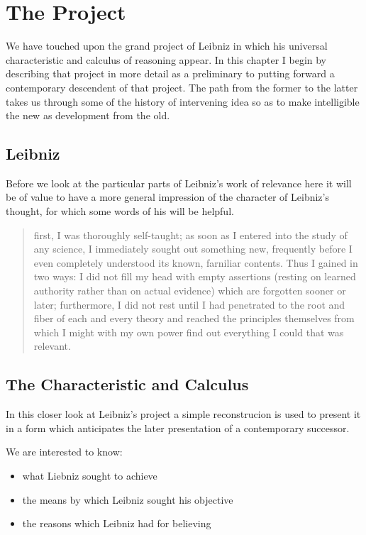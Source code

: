 
\chapter{The Project}\label{TheProject}

We have touched upon the grand project of Leibniz in which his universal characteristic
and calculus of reasoning appear.
In this chapter I begin by describing that project in more detail as a preliminary
to putting forward a contemporary descendent of that project.
The path from the former to the latter takes us through some of the history of
intervening idea so as to make intelligible the new as development from the old. 

\section{Leibniz}

Before we look at the particular parts of Leibniz's work of relevance here it will
be of value to have a more general impression of the character of Leibniz's thought,
for which some words of his will be helpful.

\begin{quotation}
first, I was thoroughly self-taught; as soon as I entered into the study of any science,
I immediately sought out something new, frequently before I even completely understood its known, farniliar contents.
Thus I gained in two ways: I did not fill my head with empty assertions (resting on learned authority rather than on actual evidence) which are forgotten sooner or later; furthermore, I did not rest until I had penetrated to the root and fiber of each and every theory and reached the principles themselves from which I might with my own power find out everything I could that was relevant.
\end{quotation}



\section{The Characteristic and Calculus}

In this closer look at Leibniz's project a simple reconstrucion is used to present
it in a form which anticipates the later presentation of a contemporary successor.

We are interested to know:

\begin{itemize}
\item what Liebniz sought to achieve
\item the means by which Leibniz sought his objective
\item the reasons which Leibniz had for believing
\end{itemize}

